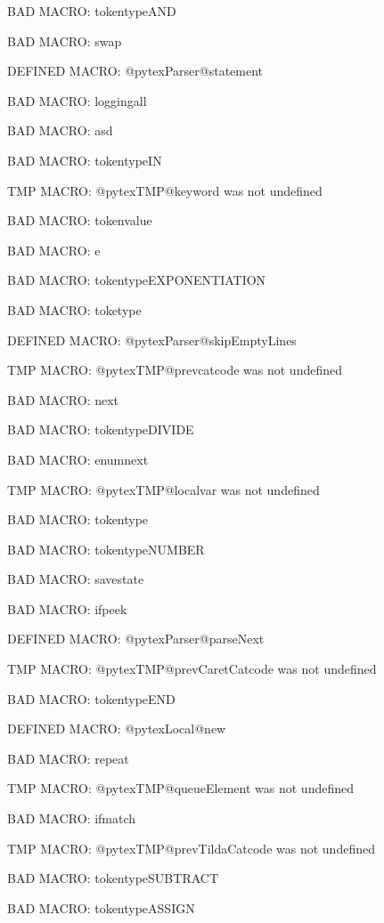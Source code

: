 BAD MACRO: tokentypeAND

BAD MACRO: swap

\ifx\@pytexParser@statement\undefined\else DEFINED MACRO: @pytexParser@statement
\fi

BAD MACRO: loggingall

BAD MACRO: asd

BAD MACRO: tokentypeIN

\ifx\@pytexTMP@keyword\undefined\else TMP MACRO: @pytexTMP@keyword was not undefined
\fi

BAD MACRO: tokenvalue

BAD MACRO: e

BAD MACRO: tokentypeEXPONENTIATION

BAD MACRO: toketype

\ifx\@pytexParser@skipEmptyLines\undefined\else DEFINED MACRO: @pytexParser@skipEmptyLines
\fi

\ifx\@pytexTMP@prevcatcode\undefined\else TMP MACRO: @pytexTMP@prevcatcode was not undefined
\fi

BAD MACRO: next

BAD MACRO: tokentypeDIVIDE

BAD MACRO: enumnext

\ifx\@pytexTMP@localvar\undefined\else TMP MACRO: @pytexTMP@localvar was not undefined
\fi

BAD MACRO: tokentype

BAD MACRO: tokentypeNUMBER

BAD MACRO: savestate

BAD MACRO: ifpeek

\ifx\@pytexParser@parseNext\undefined\else DEFINED MACRO: @pytexParser@parseNext
\fi

\ifx\@pytexTMP@prevCaretCatcode\undefined\else TMP MACRO: @pytexTMP@prevCaretCatcode was not undefined
\fi

BAD MACRO: tokentypeEND

\ifx\@pytexLocal@new\undefined\else DEFINED MACRO: @pytexLocal@new
\fi

BAD MACRO: repeat

\ifx\@pytexTMP@queueElement\undefined\else TMP MACRO: @pytexTMP@queueElement was not undefined
\fi

BAD MACRO: ifmatch

\ifx\@pytexTMP@prevTildaCatcode\undefined\else TMP MACRO: @pytexTMP@prevTildaCatcode was not undefined
\fi

BAD MACRO: tokentypeSUBTRACT

BAD MACRO: tokentypeASSIGN

